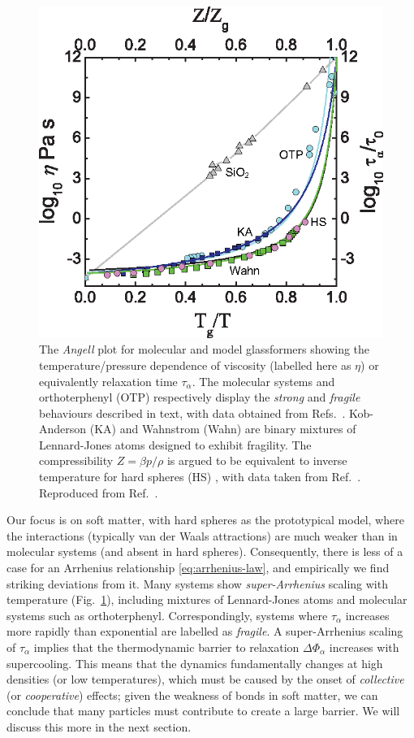 \documentclass[11pt,twoside]{report}
\begin{document}
\begin{figure}
  \includegraphics[width=0.9\linewidth,outer]{angell}
  \caption[The Angell plot for model systems undergoing dynamical arrest]{
    The \emph{Angell} plot \cite{AngellJNS1988} for molecular and model glassformers showing the temperature/pressure dependence of viscosity (labelled here as $\eta$) or equivalently relaxation time $\tau_\alpha$.
    The molecular systems  and orthoterphenyl (OTP) respectively display the \emph{strong} and \emph{fragile} behaviours described in text, with data obtained from Refs.\ \cite{AngellS1995, BerthierPRE2009}.
    Kob-Anderson (KA) and Wahnstrom (Wahn) are binary mixtures of Lennard-Jones atoms designed to exhibit fragility.
    The compressibility $Z = \beta p / \rho$ is argued to be equivalent to inverse temperature for hard spheres (HS) \cite{BerthierPRE2009}, with data taken from Ref.\ \cite{RoyallJSM2017}.
    Reproduced from Ref.\ \cite{RoyallPR2015}.
  }
  \label{fig:angell}
\end{figure}

Our focus is on soft matter, with hard spheres as the prototypical model, where the  interactions (typically van der Waals attractions) are much weaker than in molecular systems (and absent in hard spheres).
Consequently, there is less of a case for an Arrhenius relationship \eqref{eq:arrhenius-law}, and empirically we find striking deviations from it.
Many systems show \emph{super-Arrhenius} scaling with temperature (Fig.\ \ref{fig:angell}), including mixtures of Lennard-Jones atoms and molecular systems such as orthoterphenyl.
Correspondingly, systems where $\tau_\alpha$ increases more rapidly than exponential are labelled as \emph{fragile}.
A super-Arrhenius scaling of $\tau_\alpha$ implies that the thermodynamic barrier to relaxation $\Delta \Phi_\alpha$ increases with supercooling.
This means that the dynamics fundamentally changes at high densities (or low temperatures), which must be caused by the onset of \emph{collective} (or \emph{cooperative}) effects; given the weakness of bonds in soft matter, we can conclude that many particles must contribute to create a large barrier.
We will discuss this more in the next section.
\end{document}
